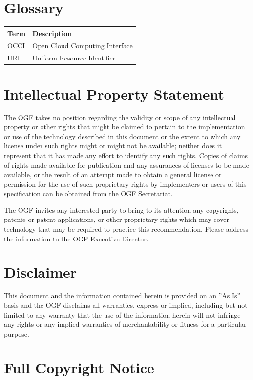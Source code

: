 \documentclass[10pt,a4paper]{article}
\begin{document}
\section{Glossary}

\begin{tabular}{l|l}
Term & Description \\
\hline
OCCI & Open Cloud Computing Interface \\
URI & Uniform Resource Identifier \\
\end{tabular}

\section{Intellectual Property Statement}

The OGF takes no position regarding the validity or scope of any intellectual property or other rights that might be claimed to pertain to the implementation or use of the technology described in this document or the extent to which any license under such rights might or might not be available; neither does it represent that it has made any effort to identify any such rights. Copies of claims of rights made available for publication and any assurances of licenses to be made available, or the result of an attempt made to obtain a general license or permission for the use of such proprietary rights by implementers or users of this specification can be obtained from the OGF Secretariat.

The OGF invites any interested party to bring to its attention any copyrights, patents or patent applications, or other proprietary rights which may cover technology that may be required to practice this recommendation. Please address the information to the OGF Executive Director.

\section{Disclaimer}

This document and the information contained herein is provided on an ''As Is'' basis and the OGF disclaims all warranties, express or implied, including but not limited to any warranty that the use of the information herein will not infringe any rights or any implied warranties of merchantability or fitness for a particular purpose.

\section{Full Copyright Notice}
\end{document}
